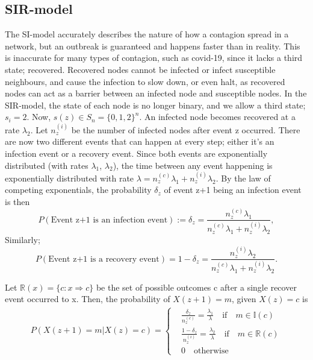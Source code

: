 \documentclass[12pt]{article} %
\numberwithin{equation}{section}
\begin{document}
\subsection{SIR-model}\label{SIR-model-section}
The SI-model accurately describes the nature of how a contagion spread in a network, but an outbreak is guaranteed and happens faster than in reality. This is inaccurate for many types of contagion, such as covid-19, since it lacks a third state; recovered. Recovered nodes cannot be infected or infect susceptible neighbours, and cause the infection to slow down, or even halt, as recovered nodes can act as a barrier between an infected node and susceptible nodes. In the SIR-model, the state of each node is no longer binary, and we allow a third state; $s_i = 2$. Now, $s(z) \in S_n = \{0,1,2\}^n$. An infected node becomes recovered at a rate $\lambda_2$. Let $n_z^{(i)}$ be the number of infected nodes after event z occurred. There are now two different events that can happen at every step; either it's an infection event or a recovery event. Since both events are exponentially distributed (with rates $\lambda_1$, $\lambda_2$), the time between any event happening is exponentially distributed with rate $\lambda = n_z^{(c)}\lambda_1+n_z^{(i)}\lambda_2$. By the law of competing exponentials, the probability $\delta_z$ of event z+1 being an infection event is then
\begin{equation}\label{SIR-P12}
    P(\text{Event z+1 is an infection event}) := \delta_z = \frac{n^{(c)}_z\lambda_1}{n^{(c)}_z\lambda_1+n^{(i)}_z\lambda_2},
\end{equation}
Similarly;
\begin{equation}
    P(\text{Event z+1 is a recovery event}) = 1-\delta_z =\frac{n^{(i)}_z\lambda_2}{n^{(c)}_z\lambda_1+n^{(i)}_z\lambda_2}.
\end{equation}

Let $\mathbb{R}(x)=\{c: x \Rightarrow c\}$ be the set of possible outcomes c after a single recover event occurred to x. Then, the probability of $X(z+1) = m$, given $X(z) = c$ is
\begin{equation} \label{firstPSIR}
\begin{split}
P(X(z+1) = m |X(z)= c) =
\begin{cases}
& \frac{\delta_z}{n_z^{(c)}} = \frac{\lambda_1}{\lambda}  \quad \text{if} \quad m \in \mathbb{I}(c) \\
& \frac{1-\delta_z}{n_z^{(i)}}  =\frac{\lambda_2}{\lambda}\quad \text{if} \quad m \in \mathbb{R}(c) \\
& 0 \quad \text{otherwise}
\end{cases}
\end{split}
\end{equation}
\end{document}
